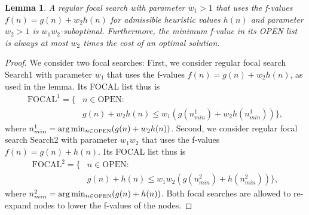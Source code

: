\documentclass[letterpaper]{article}
\newtheorem{lemma}[theorem]{Lemma}
\theoremstyle{definition}
\newcommand{\open}{\mbox{OPEN}\xspace}
\newcommand{\focal}{\mbox{FOCAL}\xspace}
\newcommand{\focaln}[1]{\ensuremath{\mbox{FOCAL}^{#1}}}
\begin{document}
\begin{lemma}
\label{lm:weighted_focal}
A regular focal search with parameter $w_1>1$ that uses the f-values $f(n) =
g(n) + w_2 h(n)$ for admissible heuristic values $h(n)$ and parameter $w_2 >
1$ is $w_1 w_2$-suboptimal. Furthermore, the minimum f-value in its \open list
is always at most $w_2$ times the cost of an optimal solution.
\end{lemma}

\begin{proof}
  We consider two focal searches: First, we consider regular focal search
  Search1 with parameter $w_1$ that uses the f-values $f(n) = g(n) + w_2
  h(n)$, as used in the lemma. Its \focal list thus is {\small
\begin{align*}
  \focaln1 = \{ & n \in \open : \\
  & g(n) + w_2 h(n) \leq w_1 ( g(n^1_{min}) + w_2 h(n^1_{min}) ) \},
\end{align*}
}where $n^1_{min} = \mbox{arg} \min_{n \in {\tiny \open}} (g(n) + w_2
h(n))$. Second, we consider regular focal search Search2 with parameter $w_1
w_2$ that uses the f-values $f(n) = g(n) + h(n)$. Its \focal list thus is
{\small
\begin{align*}
  \focaln2 = \{ & n \in \open : \\
                & g(n)+h(n) \leq w_1 w_2 ( g(n^2_{min}) + h(n^2_{min}) ) \},
\end{align*}
} where $n^2_{min} = \mbox{arg} \min_{n \in {\tiny \open}} (g(n) +
h(n))$. Both focal searches are allowed to re-expand nodes to lower the
f-values of the nodes.


\end{proof}
\end{document}
